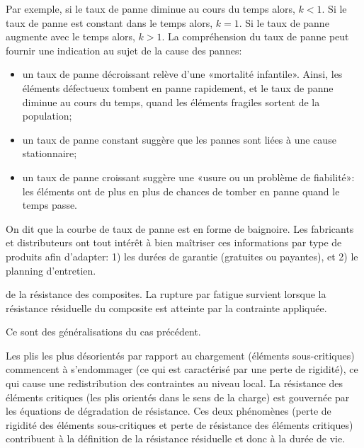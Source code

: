 \begin{description}
{\medskip
Par exemple, si le taux de panne diminue au cours du temps alors, $k < 1$.  Si le taux de panne est constant dans le temps alors, $k = 1$. Si le taux de panne augmente avec le temps alors, $k > 1$. La compréhension du taux de panne peut fournir une indication au sujet de la cause des pannes:
\begin{itemize}
	\item un taux de panne décroissant relève d'une «mortalité infantile». Ainsi, les
		éléments défectueux tombent en panne rapidement, et le taux de panne diminue
		au cours du temps, quand les éléments fragiles sortent de la population;
	\item un taux de panne constant suggère que les pannes sont liées à une cause stationnaire;
	\item un taux de panne croissant suggère une «usure ou un problème de fiabilité»:
		les éléments ont de plus en plus de chances de tomber en panne quand le temps passe.
\end{itemize}
On dit que la courbe de taux de panne est en forme de baignoire. Les fabricants et distributeurs ont tout intérêt à bien maîtriser ces informations par type de produits afin d'adapter: 1) les durées de garantie (gratuites ou payantes), et 2) le planning d'entretien.} 
de la résistance des composites. La rupture par fatigue survient lorsque la résistance résiduelle du composite est atteinte par la contrainte appliquée.

  \item[\textcolorblue{Théories de perte de rigidité:}] Ce sont des généralisations
     du cas précédent.

     Les plis les plus désorientés par rapport au chargement
     (éléments sous-critiques) commencent à s'endommager (ce
     qui est caractérisé par une perte de rigidité), ce qui cause
     une redistribution des contraintes au niveau local.
     La résistance des éléments critiques (les plis orientés
     dans le sens de la charge) est gouvernée par les équations
     de dégradation de résistance.
     Ces deux phénomènes (perte de rigidité des éléments
     sous-critiques et perte de résistance des éléments critiques)
     contribuent à la définition de la résistance résiduelle
     et donc à la durée de vie.


\end{description}
